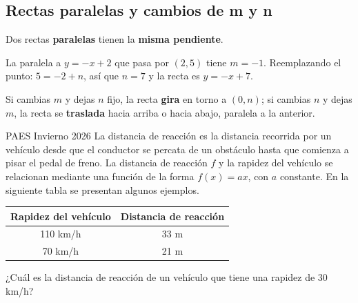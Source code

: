 \subsection{Rectas paralelas y cambios de m y n}
Dos rectas \textbf{paralelas} tienen la \textbf{misma pendiente}.
\begin{ejemplo} La paralela a $y = -x + 2$ que pasa por $(2, 5)$ tiene $m = -1$. Reemplazando el punto: $5 = -2 + n$, así que $n = 7$ y la recta es $y = -x + 7$.\end{ejemplo}
Si cambias $m$ y dejas $n$ fijo, la recta \textbf{gira} en torno a $(0, n)$; si cambias $n$ y dejas $m$, la recta se \textbf{traslada} hacia arriba o hacia abajo, paralela a la anterior.

\begin{elejemplo}{PAES Invierno 2026}
La distancia de reacción es la distancia recorrida por un vehículo desde que el conductor se percata de un obstáculo hasta que comienza a pisar el pedal de freno. La distancia de reacción $f$ y la rapidez del vehículo se relacionan mediante una función de la forma $f(x) = ax$, con $a$ constante. En la siguiente tabla se presentan algunos ejemplos.
\begin{center}
\begin{tabular}{cc}\toprule
Rapidez del vehículo & Distancia de reacción\\\midrule
110 km/h & 33 m\\ 70 km/h & 21 m\\\bottomrule
\end{tabular}
\end{center}
¿Cuál es la distancia de reacción de un vehículo que tiene una rapidez de 30 km/h?
\end{elejemplo}

